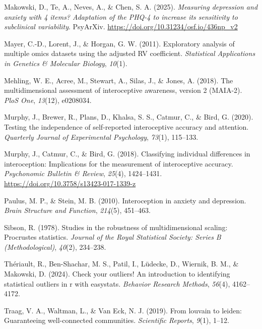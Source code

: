 \documentclass[
  jou,
  floatsintext,
  longtable,
  nolmodern,
  notxfonts,
  notimes,
  colorlinks=true,linkcolor=blue,citecolor=blue,urlcolor=blue]{apa7}
\newlength{\cslhangindent}
\newenvironment{CSLReferences}[2] %
 {\begin{list}{}{%
  \setlength{\itemindent}{0pt}
  \setlength{\leftmargin}{0pt}
  \setlength{\parsep}{0pt}
  \ifodd #1
   \setlength{\leftmargin}{\cslhangindent}
   \setlength{\itemindent}{-1\cslhangindent}
  \fi
  \setlength{\itemsep}{#2\baselineskip}}}
 {\end{list}}
\begin{document}
\begin{CSLReferences}{1}{0}
Makowski, D., Te, A., Neves, A., \& Chen, S. A. (2025). \emph{Measuring
depression and anxiety with 4 items? Adaptation of the PHQ-4 to increase
its sensitivity to subclinical variability}. PsyArXiv.
\url{https://doi.org/10.31234/osf.io/436np_v2}

Mayer, C.-D., Lorent, J., \& Horgan, G. W. (2011). Exploratory analysis
of multiple omics datasets using the adjusted RV coefficient.
\emph{Statistical Applications in Genetics \& Molecular Biology},
\emph{10}(1).

Mehling, W. E., Acree, M., Stewart, A., Silas, J., \& Jones, A. (2018).
The multidimensional assessment of interoceptive awareness, version 2
(MAIA-2). \emph{PloS One}, \emph{13}(12), e0208034.

Murphy, J., Brewer, R., Plans, D., Khalsa, S. S., Catmur, C., \& Bird,
G. (2020). Testing the independence of self-reported interoceptive
accuracy and attention. \emph{Quarterly Journal of Experimental
Psychology}, \emph{73}(1), 115--133.

Murphy, J., Catmur, C., \& Bird, G. (2018). Classifying individual
differences in interoception: Implications for the measurement of
interoceptive accuracy. \emph{Psychonomic Bulletin \& Review},
\emph{25}(4), 1424--1431.
\url{https://doi.org/10.3758/s13423-017-1339-z}

Paulus, M. P., \& Stein, M. B. (2010). Interoception in anxiety and
depression. \emph{Brain Structure and Function}, \emph{214}(5),
451--463.

Sibson, R. (1978). Studies in the robustness of multidimensional
scaling: Procrustes statistics. \emph{Journal of the Royal Statistical
Society: Series B (Methodological)}, \emph{40}(2), 234--238.

Thériault, R., Ben-Shachar, M. S., Patil, I., Lüdecke, D., Wiernik, B.
M., \& Makowski, D. (2024). Check your outliers! An introduction to
identifying statistical outliers in r with easystats. \emph{Behavior
Research Methods}, \emph{56}(4), 4162--4172.

Traag, V. A., Waltman, L., \& Van Eck, N. J. (2019). From louvain to
leiden: Guaranteeing well-connected communities. \emph{Scientific
Reports}, \emph{9}(1), 1--12.


\end{CSLReferences}
\end{document}
